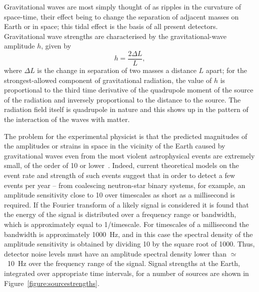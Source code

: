 \documentclass{article}
\newcommand{\Hz}{Hz\super{-1/2}\xspace}
\begin{document}
Gravitational waves are most simply thought of as ripples in the curvature of
space-time, their effect being to change the separation of adjacent masses on
Earth or in space; this tidal effect is the basis of all present detectors.
Gravitational wave strengths are characterised by the gravitational-wave
amplitude $h$, given by
%
\begin{equation}
  h = \frac{2 \Delta L} L,
  \label{equation:h}
\end{equation}
%
where $\Delta L$ is the change in separation of two masses a distance $L$ apart;
for the strongest-allowed component of gravitational radiation, the value of $h$
is proportional to the third time derivative of the quadrupole moment of the
source of the radiation and inversely proportional to the distance to the
source. The radiation field itself is quadrupole in nature and this shows up in
the pattern of the interaction of the waves with matter.

The problem for the experimental physicist is that the predicted magnitudes of
the amplitudes or strains in space in the vicinity of the Earth caused by
gravitational waves even from the most violent astrophysical events are
extremely small, of the order of 10 or lower~\cite{Sathyaprakash:2009,
LISAsymposium}. Indeed, current theoretical models on the event rate and strength
of such events suggest that in order to detect a few events per year -- from
coalescing neutron-star binary systems, for example, an amplitude sensitivity
close to 10 over timescales as short as a millisecond is required. If
the Fourier transform of a likely signal is considered it is found that the
energy of the signal is distributed over a frequency range or bandwidth, which is
approximately equal to 1/timescale.  For timescales of a millisecond the
bandwidth is approximately 1000~Hz, and in this case the spectral density of the
amplitude sensitivity is obtained by dividing 10 by the square root of
1000. Thus, detector noise levels must have an amplitude spectral density lower
than $\simeq$~10~\Hz over the frequency range of the signal.
Signal strengths at the Earth, integrated over appropriate time intervals, for a
number of sources are shown in Figure~\ref{figure:sourcestrengths}.
\end{document}
